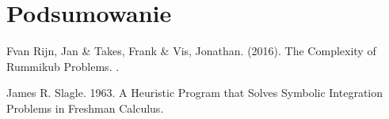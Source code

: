 \documentclass[twoside,twocolumn]{article}
\begin{document}
\section{Podsumowanie}


\begin{thebibliography}{99} %

Fvan Rijn, Jan \& Takes, Frank \& Vis, Jonathan. (2016). 
\newblock The Complexity of Rummikub Problems.
.
 
James R. Slagle. 1963.
\newblock A Heuristic Program that Solves Symbolic Integration Problems in Freshman Calculus. 
\end{thebibliography}

\end{document}
